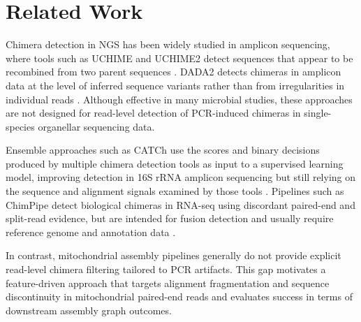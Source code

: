 \section{Related Work}

Chimera detection in NGS has been widely studied in amplicon sequencing, where tools such as UCHIME and UCHIME2 detect sequences that appear to be recombined from two parent sequences \cite{Edgar2011,Edgar2016}. DADA2 detects chimeras in amplicon data at the level of inferred sequence variants rather than from irregularities in individual reads \cite{Callahan2016}. Although effective in many microbial studies, these approaches are not designed for read-level detection of PCR-induced chimeras in single-species organellar sequencing data.

Ensemble approaches such as CATCh use the scores and binary decisions produced by multiple chimera detection tools as input to a supervised learning model, improving detection in 16S rRNA amplicon sequencing but still relying on the sequence and alignment signals examined by those tools \cite{Mysara2015}. Pipelines such as ChimPipe detect biological chimeras in RNA-seq using discordant paired-end and split-read evidence, but are intended for fusion detection and usually require reference genome and annotation data \cite{Rodriguez2017}.

In contrast, mitochondrial assembly pipelines generally do not provide explicit read-level chimera filtering tailored to PCR artifacts. This gap motivates a feature-driven approach that targets alignment fragmentation and sequence discontinuity in mitochondrial paired-end reads and evaluates success in terms of downstream assembly graph outcomes.

